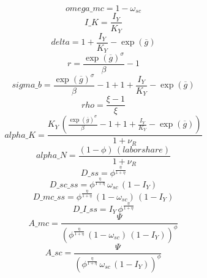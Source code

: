 \begin{dmath*}
omega\_mc = 1-{\omega_{sc}}
\end{dmath*}
\begin{dmath*}
I\_K = \frac{{{I_Y}}}{{{K_Y}}}
\end{dmath*}
\begin{dmath*}
delta = 1+\frac{{{I_Y}}}{{{K_Y}}}-\exp\left({{\overline{g}}}\right)
\end{dmath*}
\begin{dmath*}
r = \frac{\exp\left({{\overline{g}}}\right)^{{{\sigma}}}}{{{\beta}}}-1
\end{dmath*}
\begin{dmath*}
sigma\_b = \frac{\exp\left({{\overline{g}}}\right)^{{{\sigma}}}}{{{\beta}}}-1+1+\frac{{{I_Y}}}{{{K_Y}}}-\exp\left({{\overline{g}}}\right)
\end{dmath*}
\begin{dmath*}
rho = \frac{{\xi}-1}{{\xi}}
\end{dmath*}
\begin{dmath*}
alpha\_K = \frac{{{K_Y}}\, \left(\frac{\exp\left({{\overline{g}}}\right)^{{{\sigma}}}}{{{\beta}}}-1+1+\frac{{{I_Y}}}{{{K_Y}}}-\exp\left({{\overline{g}}}\right)\right)}{1+{{\nu_R}}}
\end{dmath*}
\begin{dmath*}
alpha\_N = \frac{\left(1-{{\phi}}\right)\, {(labor share)}}{1+{{\nu_R}}}
\end{dmath*}
\begin{dmath*}
D\_ss = {{\phi}}^{\frac{{{\eta}}}{1+{{\eta}}}}
\end{dmath*}
\begin{dmath*}
D\_sc\_ss = {{\phi}}^{\frac{{{\eta}}}{1+{{\eta}}}}\, {\omega_{sc}}\, \left(1-{{I_Y}}\right)
\end{dmath*}
\begin{dmath*}
D\_mc\_ss = {{\phi}}^{\frac{{{\eta}}}{1+{{\eta}}}}\, \left(1-{\omega_{sc}}\right)\, \left(1-{{I_Y}}\right)
\end{dmath*}
\begin{dmath*}
D\_I\_ss = {{I_Y}}\, {{\phi}}^{\frac{{{\eta}}}{1+{{\eta}}}}
\end{dmath*}
\begin{dmath*}
A\_mc = \frac{{{\Psi}}}{\left({{\phi}}^{\frac{{{\eta}}}{1+{{\eta}}}}\, \left(1-{\omega_{sc}}\right)\, \left(1-{{I_Y}}\right)\right)^{{{\phi}}}}
\end{dmath*}
\begin{dmath*}
A\_sc = \frac{{{\Psi}}}{\left({{\phi}}^{\frac{{{\eta}}}{1+{{\eta}}}}\, {\omega_{sc}}\, \left(1-{{I_Y}}\right)\right)^{{{\phi}}}}
\end{dmath*}
